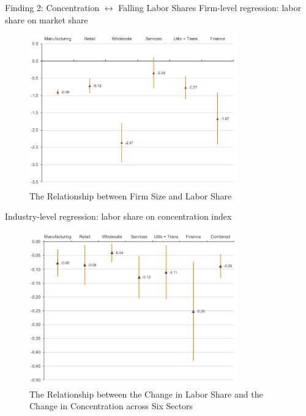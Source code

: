 \documentclass[
  10pt,
  ignorenonframetext,
  aspectratio=43,
]{beamer}
\begin{document}
\begin{frame}{Finding 2: Concentration \(\leftrightarrow\) Falling Labor
Shares}
\protect\hypertarget{finding-2-concentration-leftrightarrow-falling-labor-shares}{}
Firm-level regression: labor share on market share

\begin{figure}
\centering
\includegraphics[width=0.8\textwidth,height=\textheight]{./images/Pasted image 20220516204633.png}
\caption{The Relationship between Firm Size and Labor Share}
\end{figure}
\end{frame}

\begin{frame}
Industry-level regression: labor share on concentration index

\begin{figure}
\centering
\includegraphics[width=0.8\textwidth,height=\textheight]{./images/Pasted image 20220516205909.png}
\caption{The Relationship between the Change in Labor Share and the
Change in Concentration across Six Sectors}
\end{figure}
\end{frame}
\end{document}

